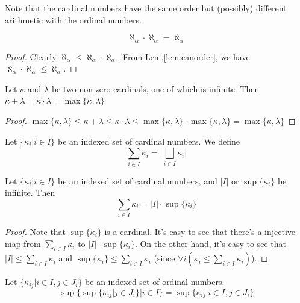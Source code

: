 \documentclass[12pt]{book}
\begin{document}
Note that the cardinal numbers have the same order but (possibly) different arithmetic with the ordinal numbers.

\begin{theorem}
	\begin{equation}
		\aleph_\alpha\cdot\aleph_\alpha=\aleph_\alpha
	\end{equation}
\end{theorem}
\begin{proof}
	Clearly $\aleph_\alpha\leq\aleph_\alpha\cdot\aleph_\alpha$. From Lem.\ref{lem:canorder}, we have $\aleph_\alpha\cdot\aleph_\alpha\leq\aleph_\alpha$.
\end{proof}
\begin{corollary}
	Let $\kappa$ and $\lambda$ be two non-zero cardinals, one of which is infinite. Then $\kappa+\lambda=\kappa\cdot\lambda=\max\{\kappa,\lambda\}$
\end{corollary}
\begin{proof}
	$\max\{\kappa,\lambda\}\leq\kappa+\lambda\leq\kappa\cdot\lambda\leq\max\{\kappa,\lambda\}\cdot\max\{\kappa,\lambda\}=\max\{\kappa,\lambda\}$
\end{proof}

\begin{definition}
	Let $\{\kappa_i|i\in I\}$ be an indexed set of cardinal numbers. We define
	\begin{equation}
		\sum_{i\in I}\kappa_i=\Big|\bigsqcup_{i\in I}\kappa_i\Big|
	\end{equation}
\end{definition}

\begin{lemma}
	Let $\{\kappa_i|i\in I\}$ be an indexed set of cardinal numbers, and $|I|$ or $\sup\{\kappa_i\}$ be infinite. Then
	\begin{equation}
		\sum_{i\in I}\kappa_i=|I|\cdot \sup\{\kappa_i\}
	\end{equation}
\end{lemma}
\begin{proof}
	Note that $\sup\{\kappa_i\}$ is a cardinal. It's easy to see that there's a injective map from $\sum_{i\in I}\kappa_i$ to $|I|\cdot \sup\{\kappa_i\}$. On the other hand, it's easy to see that $|I|\leq\sum_{i\in I}\kappa_i$ and $\sup\{\kappa_i\}\leq \sum_{i\in I}\kappa_i$ (since $\forall i(\kappa_i\leq \sum_{i\in I}\kappa_i)$).
\end{proof}

\begin{lemma}
	Let $\{\kappa_{ij}|i\in I, j\in J_i\}$ be an indexed set of ordinal numbers. 
	\begin{equation}
		\sup\{\sup\{ \kappa_{ij}|j\in J_i\}|i\in I\}=\sup\{ \kappa_{ij}|i\in I,j\in J_i\}
	\end{equation}
	\label{lem:inf_sum_lim}
\end{lemma}
\end{document}

